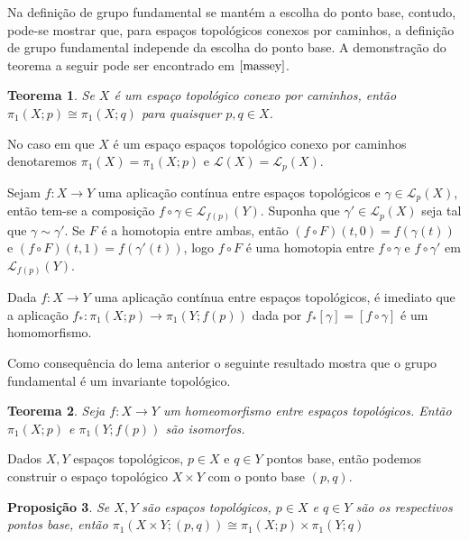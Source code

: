 \documentclass[12pt]{book}
\newtheorem{teorema}{Teorema}[section]
\newtheorem{proposicao}[teorema]{Proposição}
\newcommand{\caminhos}{\mathcal{L}}
\newcommand{\caminhossempontobase}[1]{\caminhos(#1)}
\newcommand{\caminhospontobasegeral}[2]{\caminhos_{#1}(#2)}
\newcommand{\classe}[1]{[#1]}
\newcommand{\grupofundamental}[1]{\pi_{1}(#1)}
\newcommand{\grupofundamentalpontobase}[2]{\pi_{1}(#1; #2)}
\begin{document}
	Na definição de grupo fundamental se mantém a escolha do ponto base, contudo, pode-se mostrar que, para espaços topológicos conexos por caminhos, a definição de grupo fundamental independe da escolha do ponto base. A demonstração do teorema a seguir pode ser encontrado em $\cite{massey}$.
	
	\begin{teorema}
		Se $X$ é um espaço topológico conexo por caminhos, então $\grupofundamentalpontobase{X}{p} \cong \grupofundamentalpontobase{X}{q}$ para quaisquer $p,q \in X$.
	\end{teorema}
	
	No caso em que $X$ é um espaço espaços topológico conexo por caminhos denotaremos $\grupofundamental{X}=\grupofundamentalpontobase{X}{p}$ e $\caminhossempontobase{X}=\caminhospontobasegeral{p}{X}$.
	
	
	Sejam $f:X\to Y$ uma aplicação contínua entre espaços topológicos e $\gamma \in \caminhospontobasegeral{p}{X}$, então tem-se a composição $f\circ \gamma \in \caminhospontobasegeral{f(p)}{Y}$. Suponha que $\gamma' \in \caminhospontobasegeral{p}{X}$ seja tal que $\gamma \sim \gamma'$. Se $F$ é a homotopia entre ambas, então $(f\circ F)(t,0) =  f(\gamma(t))$ e $(f\circ F)(t,1) =  f(\gamma'(t)) $, logo $f\circ F$ é uma homotopia entre $f\circ \gamma$ e $f\circ \gamma'$ em $\caminhospontobasegeral{f(p)}{Y}$.
	
	Dada $f:X\to Y$ uma aplicação contínua entre espaços topológicos, é imediato que a aplicação $f_{*}:\grupofundamentalpontobase{X}{p} \to \grupofundamentalpontobase{Y}{f(p)}$ dada por $f_{*}\classe{\gamma} = \classe{f\circ\gamma}$ é um homomorfismo.
	
	Como consequência do lema anterior o seguinte resultado mostra que o grupo fundamental é um invariante topológico.
	\begin{teorema}
		Seja $f:X\to Y$ um homeomorfismo entre espaços topológicos. Então $\grupofundamentalpontobase{X}{p}$ e $\grupofundamentalpontobase{Y}{f(p)}$ são isomorfos.
	\end{teorema}
	
	Dados $X, Y$ espaços topológicos, $p\in X$ e $q\in Y$ pontos base, então podemos construir o espaço topológico $X\times Y$ com o ponto base $(p,q)$.
	
	\begin{proposicao}\label{proposicao_produto_grupo_fundamental}
		Se $X, Y$ são espaços topológicos, $p\in X$ e $q\in Y$ são os respectivos pontos base, então $\grupofundamentalpontobase{X\times Y}{(p,q)} \cong \grupofundamentalpontobase{X}{p}\times \grupofundamentalpontobase{Y}{q}$
	\end{proposicao}
	
\end{document}
